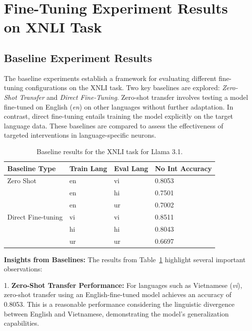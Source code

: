 \section{Fine-Tuning Experiment Results on XNLI Task}

\subsection{Baseline Experiment Results}

 The baseline experiments establish a framework for evaluating different fine-tuning configurations on the XNLI task. Two key baselines are explored: \textit{Zero-Shot Transfer} and \textit{Direct Fine-Tuning}. Zero-shot transfer involves testing a model fine-tuned on English (\textit{en}) on other languages without further adaptation. In contrast, direct fine-tuning entails training the model explicitly on the target language data. These baselines are compared to assess the effectiveness of targeted interventions in language-specific neurons.

\begin{table}[ht]
	\centering
	\renewcommand{\arraystretch}{1.3}
	\setlength{\tabcolsep}{8pt}
	\begin{tabularx}{\textwidth}{|X|X|X|X|}
		\hline
		\textbf{Baseline Type} & \textbf{Train Lang} & \textbf{Eval Lang} & \textbf{No Int Accuracy} \\
		\hline
		Zero Shot & en & vi & 0.8053 \\
		& en & hi & 0.7501 \\
		& en & ur & 0.7002 \\
		\hline
		Direct Fine-tuning & vi & vi & 0.8511 \\
		& hi & hi & 0.8043 \\
		& ur & ur & 0.6697 \\
		\hline
	\end{tabularx}
	\caption{Baseline results for the XNLI task for Llama 3.1.}
	\label{tab:updated_baseline_results}
\end{table}

\textbf{Insights from Baselines:}
The results from Table~\ref{tab:updated_baseline_results} highlight several important observations:

1. \textbf{Zero-Shot Transfer Performance:} 
For languages such as Vietnamese (\textit{vi}), zero-shot transfer using an English-fine-tuned model achieves an accuracy of 0.8053. This is a reasonable performance considering the linguistic divergence between English and Vietnamese, demonstrating the model's generalization capabilities.

